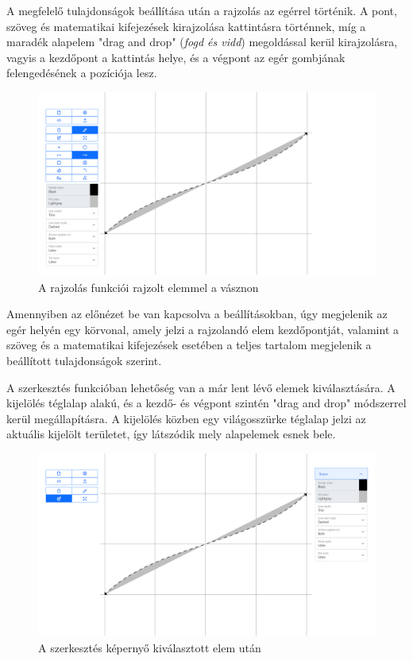 A megfelelő tulajdonságok beállítása után a rajzolás az egérrel történik. A pont, szöveg és matematikai kifejezések kirajzolása kattintásra történnek, míg a maradék alapelem "drag and drop" (\textit{fogd és vidd}) megoldással kerül kirajzolásra, vagyis a kezdőpont a kattintás helye, és a végpont az egér gombjának felengedésének a pozíciója lesz.

\begin{figure}[!h]
	\label{fig:draw}
	\centering
	\includegraphics[width=\textwidth]{images/editor_draw.png}
	\caption{A rajzolás funkciói rajzolt elemmel a vásznon}
\end{figure}

Amennyiben az előnézet be van kapcsolva a beállításokban, úgy megjelenik az egér helyén egy körvonal, amely jelzi a rajzolandó elem kezdőpontját, valamint a szöveg és a matematikai kifejezések esetében a teljes tartalom megjelenik a beállított tulajdonságok szerint.



A szerkesztés funkcióban lehetőség van a már lent lévő elemek kiválasztására. A kijelölés téglalap alakú, és a kezdő- és végpont szintén "drag and drop" módszerrel kerül megállapításra. A kijelölés közben egy világosszürke téglalap jelzi az aktuális kijelölt területet, így látszódik mely alapelemek esnek bele.

\begin{figure}[!h]
	\label{fig:edit}
	\centering
	\includegraphics[width=\textwidth]{images/editor_edit.png}
	\caption{A szerkesztés képernyő kiválasztott elem után}
\end{figure}

